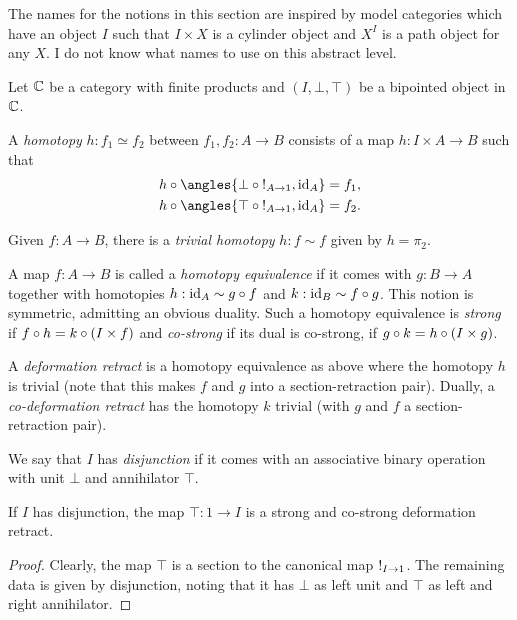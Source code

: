 \documentclass[reqno,10pt,a4paper,oneside]{amsart}
\begin{document}
The names for the notions in this section are inspired by model categories which have an object $I$ such that $I \times X$ is a cylinder object and $X^I$ is a path object for any $X$.
I do not know what names to use on this abstract level.

Let $\mathbb{C}$ be a category with finite products and $(I, \bot, \top)$ be a bipointed object in $\mathbb{C}$.

\begin{definition}
\label{def:homotopy}
A \emph{homotopy} $h : f_1 \simeq f_2$ between $f_1, f_2 : A \to B$ consists of a map $h : I \times A \to B$ such that
\begin{align*}
h \cc \angles{\bot \cc \canonical_{A \to 1}, \id_A} &= f_1
,\\
h \cc \angles{\top \cc \canonical_{A \to 1}, \id_A} &= f_2
.\end{align*}

Given $f : A \to B$, there is a \emph{trivial homotopy} $h : f \sim f$ given by $h = \pi_2$. 
\end{definition}

\begin{definition}
\label{def:homotopy-equivalence}
A map $f : A \to B$ is called a \emph{homotopy equivalence} if it comes with $g : B \to A$ together with homotopies $h : \operatorname{id}_A \sim g \mathbin{\circ} f$ and $k : \operatorname{id}_B \sim f \mathbin{\circ} g$.
This notion is symmetric, admitting an obvious duality.
Such a homotopy equivalence is \emph{strong} if $f \mathbin{\circ} h = k \mathbin{\circ} (I \times f)$ and \emph{co-strong} if its dual is co-strong, \ie if $g \mathbin{\circ} k = h \mathbin{\circ} (I \times g)$.

A \emph{deformation retract} is a homotopy equivalence as above where the homotopy $h$ is trivial (note that this makes $f$ and $g$ into a section-retraction pair).
Dually, a \emph{co-deformation retract} has the homotopy $k$ trivial (with $g$ and $f$ a section-retraction pair).
\end{definition}

We say that $I$ has \emph{disjunction} if it comes with an associative binary operation with unit $\bot$ and annihilator $\top$.

\begin{example}
\label{disjunction-deformation-retract}
If $I$ has disjunction, the map $\top : 1 \to I$ is a strong and co-strong deformation retract.
\end{example}

\begin{proof}
Clearly, the map $\top$ is a section to the canonical map $\mathord{!}_{I \to 1}$.
The remaining data is given by disjunction, noting that it has $\bot$ as left unit and $\top$ as left and right annihilator.
\end{proof}
\end{document}
